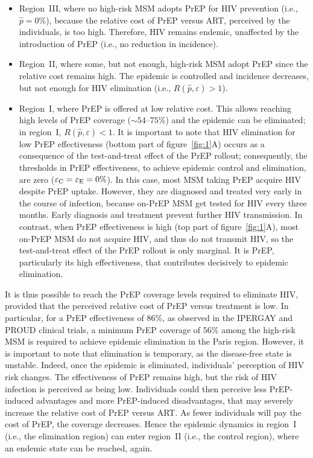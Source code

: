 \documentclass[preprint,review,12pt]{article}			%
\begin{document}
\begin{itemize}
\item Region~III, where no high-risk MSM adopts PrEP for HIV prevention (i.e., $\hat{p}=0\%$), because 
the relative cost of PrEP versus ART, perceived by the individuals, is too high. Therefore, HIV remains endemic, unaffected by the introduction of PrEP (i.e., no reduction in incidence).

\item Region~II, where some, but not enough, high-risk MSM adopt PrEP since the relative cost remains high. The epidemic is controlled and incidence decreases, but not enough for HIV elimination (i.e., $R(\hat{p},\varepsilon)>1$).

\item Region~I, where PrEP is offered at low relative cost. This allows reaching high levels of PrEP coverage ($\sim 54$--$75\%$) and the epidemic can be eliminated; in region~I, $R(\hat{p},\varepsilon)<1$. It is important to note that HIV elimination for low PrEP effectiveness (bottom part of figure~\ref{fig:1}A) occurs as a consequence of the test-and-treat effect of the PrEP rollout; consequently, the thresholds in PrEP effectiveness, to achieve epidemic control and elimination, are zero ($\varepsilon_{\rm C}= \varepsilon_{\rm E}= 0\%$). In this case, most MSM taking PrEP acquire HIV despite PrEP uptake. However, they are diagnosed and treated very early in the course of infection, because on-PrEP MSM get tested for HIV every three months. Early diagnosis and treatment prevent further HIV transmission. In contrast, when PrEP effectiveness is high (top part of figure~\ref{fig:1}A), most on-PrEP MSM do not acquire HIV, and thus do not transmit HIV, so the test-and-treat effect of the PrEP rollout is only marginal. It is PrEP, particularly its high effectiveness, that contributes decisively to epidemic elimination. 
\end{itemize}
 
It is thus possible to reach the PrEP coverage levels required to eliminate HIV, provided that the perceived relative cost of PrEP versus treatment is low. In particular, for a PrEP effectiveness of $86\%$, as observed in the IPERGAY and PROUD clinical trials, a minimum PrEP coverage of $56\%$ among the high-risk MSM is required to achieve epidemic elimination in the Paris region. However, it is important to note that elimination is temporary, as the disease-free state is unstable. Indeed, once the epidemic is eliminated, individuals' perception of HIV risk changes. The effectiveness of PrEP remains high, but the risk of HIV infection is perceived as being low. Individuals could then perceive less PrEP-induced advantages and more PrEP-induced disadvantages, that may severely increase the relative cost of PrEP versus ART. As fewer individuals will pay the cost of PrEP, the coverage decreases. Hence the epidemic dynamics in region~I (i.e., the elimination region) can enter region~II (i.e., the control region), where an endemic state can be reached, again.
\end{document}
